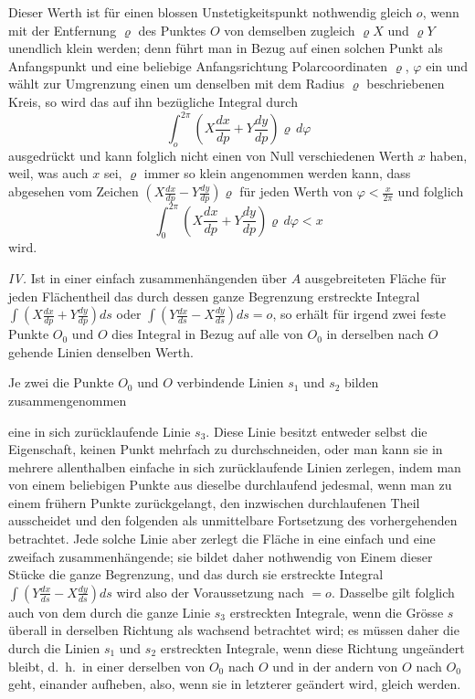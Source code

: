 \documentclass{article}
\begin{document}
Dieser Werth ist für einen blossen Unstetigkeitspunkt nothwendig gleich $o$, wenn mit der Entfernung $\varrho$ des Punktes $O$ von demselben zugleich $\varrho X$ und $\varrho Y$ unendlich klein werden; denn führt man in Bezug auf einen solchen Punkt als Anfangspunkt und eine beliebige Anfangsrichtung Polarcoordinaten $\varrho$, $\varphi$ ein und wählt zur Umgrenzung einen um denselben mit dem Radius $\varrho$ beschriebenen Kreis, so wird das auf ihn bezügliche Integral durch
\[
\int_o^{2\pi} \left(X\frac{dx}{dp} + Y\frac{dy}{dp}\right) \varrho\,d\varphi
\]
ausgedrückt und kann folglich nicht einen von Null verschiedenen Werth $x$ haben, weil, was auch $x$ sei, $\varrho$ immer so klein angenommen werden kann, dass abgesehen vom Zeichen $\left(X\frac{dx}{dp} - Y\frac{dy}{dp}\right)\varrho$ für jeden Werth von $\varphi < \frac{x}{2\pi}$ und folglich
\[
\int_0^{2\pi} \left(X\frac{dx}{dp} + Y\frac{dy}{dp}\right) \varrho\,d\varphi < x
\]
wird.

\emph{IV.} Ist in einer einfach zusammenhängenden über $A$ ausgebreiteten Fläche für jeden Flächentheil das durch dessen ganze Begrenzung erstreckte Integral $\displaystyle\int \left(X\frac{dx}{dp} + Y\frac{dy}{dp}\right) ds$ oder $\displaystyle\int \left(Y\frac{dx}{ds} - X\frac{dy}{ds}\right) ds = o$, so erhält für irgend zwei feste Punkte $O_0$ und $O$ dies Integral in Bezug auf alle von $O_0$ in derselben nach $O$ gehende Linien denselben Werth.

Je zwei die Punkte $O_0$ und $O$ verbindende Linien $s_1$ und $s_2$ bilden zusammengenommen

eine in sich zurücklaufende Linie $s_3$. Diese Linie besitzt entweder selbst die Eigenschaft, keinen Punkt mehrfach zu durchschneiden, oder man kann sie in mehrere allenthalben einfache in sich zurücklaufende Linien zerlegen, indem man von einem beliebigen Punkte aus dieselbe durchlaufend jedesmal, wenn man zu einem frühern Punkte zurückgelangt, den inzwischen durchlaufenen Theil ausscheidet und den folgenden als unmittelbare Fortsetzung des vorhergehenden betrachtet. Jede solche Linie aber zerlegt die Fläche in eine einfach und eine zweifach zusammenhängende; sie bildet daher nothwendig von Einem dieser Stücke die ganze Begrenzung, und das durch sie erstreckte Integral $\displaystyle\int \left(Y\frac{dx}{ds} - X\frac{dy}{ds}\right) ds$ wird also der Voraussetzung nach $= o$. Dasselbe gilt folglich auch von dem durch die ganze Linie $s_3$ erstreckten Integrale, wenn die Grösse $s$ überall in derselben Richtung als wachsend betrachtet wird; es müssen daher die durch die Linien $s_1$ und $s_2$ erstreckten Integrale, wenn diese Richtung ungeändert bleibt, d.\ h.\ in einer derselben von $O_0$ nach $O$ und in der andern von $O$ nach $O_0$ geht, einander aufheben, also, wenn sie in letzterer geändert wird, gleich werden.
\end{document}
